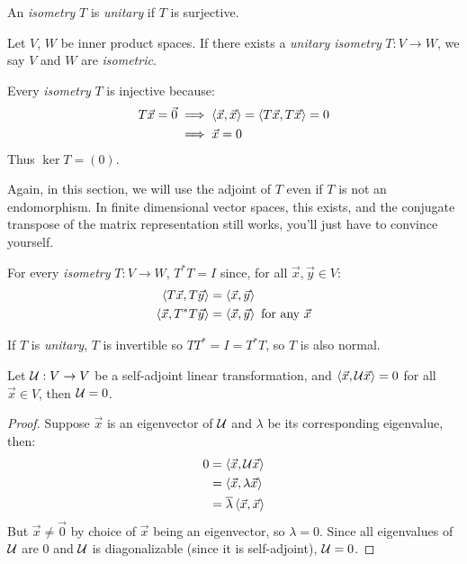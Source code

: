 \begin{definition}
  An \emph{isometry} $T$ is \emph{unitary} if $T$ is surjective.
\end{definition}

\begin{definition}
  Let $V$, $W$ be inner product spaces. If there exists a \emph{unitary isometry} $T : V \to W$,
  we say $V$ and $W$ are \emph{isometric}.
\end{definition}

\begin{remark}
  Every \emph{isometry} $T$ is injective because:
    \begin{align}
      T \vec x = \vec 0
        &\implies \left\langle \vec x , \vec x \right\rangle = \left\langle T \vec x , T \vec x \right\rangle = 0 \\
        &\implies \vec x = 0
    \end{align}
  Thus $\ker T = (0)$.
\end{remark}

\begin{remark}
  Again, in this section, we will use the adjoint of $T$ even if $T$ is not an endomorphism.
  In finite dimensional vector spaces, this exists, and the conjugate transpose of the
  matrix representation still works, you'll just have to convince yourself.
\end{remark}

\begin{remark}
  For every \emph{isometry} $T : V \to W$, $T^*T = I$ since, for all $\vec x, \vec y \in V$:
  \begin{align}
    \left\langle T \vec x , T \vec y \right\rangle &= \left\langle \vec x , \vec y \right\rangle \\
    \left\langle \vec x , T^* T \vec y \right\rangle &= \left\langle \vec x , \vec y \right\rangle \text{ for any } \vec x
  \end{align}
\end{remark}

\begin{remark}
  If $T$ is \emph{unitary}, $T$ is invertible so $T T^* = I = T^* T$, so $T$ is also normal.
\end{remark}

\begin{lemma}\label{selfadjointlintranszero}
  Let $\mathcal{U} : V \to V$ be a self-adjoint linear transformation, and $\left\langle \vec x , \mathcal{U} \vec x \right\rangle = 0$ for all $\vec x \in V$,
  then $\mathcal{U} = 0$.
\end{lemma}
\begin{proof}
  Suppose $\vec x$ is an eigenvector of $\mathcal{U}$ and $\lambda$ be its corresponding eigenvalue, then:
  \begin{align}
    0 &= \left\langle \vec x , \mathcal{U} \vec x \right\rangle \\
      &= \left\langle \vec x , \lambda \vec x \right\rangle \\
      &= \overline{\lambda}\left\langle \vec x , \vec x \right\rangle
  \end{align}
  But $\vec x \ne \vec 0$ by choice of $\vec x$ being an eigenvector, so $\lambda = 0$.
  Since all eigenvalues of $\mathcal{U}$ are 0 and $\mathcal{U}$ is diagonalizable (since it is self-adjoint), $\mathcal{U} = 0$.
\end{proof}

